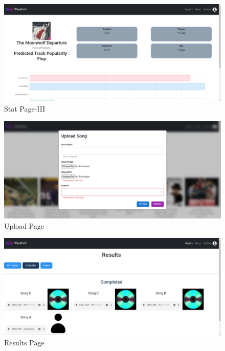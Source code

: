 \documentclass[11pt]{report}
\begin{document}
\begin{figure}[h]
    \centering
    \includegraphics[width=1\linewidth]{screenshots/7.stat.png}
    \caption{Stat Page-III}

\end{figure}

\begin{figure}[h]
    \centering
    \includegraphics[height=.4\linewidth]{screenshots/8.upload.png}
    \caption{Upload Page}
   
\end{figure}

\begin{figure}[h]
    \centering
    \includegraphics[height=.5\linewidth]{screenshots/9.results.png}
    \caption{Results Page}
 
\end{figure}
\end{document}
